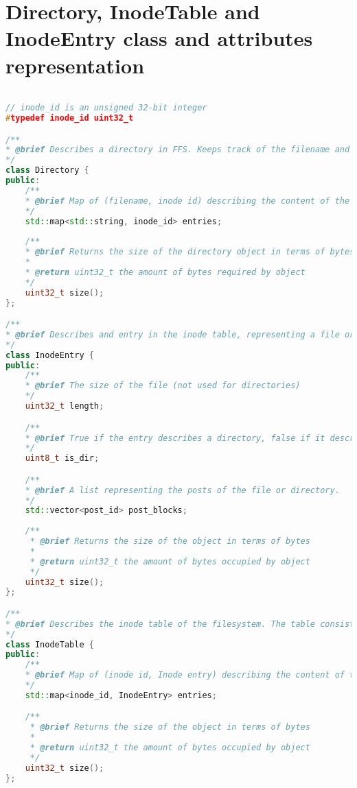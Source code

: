 \chapter{Directory, InodeTable and InodeEntry class and attributes representation}
\label{app:inode_dir_code}
\begin{lstlisting}[language=c++, caption={The attributes classes representing directories and the inode table in FFS}, label=lst:dir_itable_classes,breaklines=true]

// inode_id is an unsigned 32-bit integer
#typedef inode_id uint32_t

/**
* @brief Describes a directory in FFS. Keeps track of the filename and inode of each file
*/
class Directory {
public:
	/**
	* @brief Map of (filename, inode id) describing the content of the directory
	*/
	std::map<std::string, inode_id> entries;
	
	/**
	* @brief Returns the size of the directory object in terms of bytes
	* 
	* @return uint32_t the amount of bytes required by object
	*/
	uint32_t size();
};

/**
* @brief Describes and entry in the inode table, representing a file or directory
*/
class InodeEntry {
public:
	/**
	* @brief The size of the file (not used for directories) 
	*/
	uint32_t length;

	/**
	* @brief True if the entry describes a directory, false if it describes a file
	*/
	uint8_t is_dir;

	/**
	* @brief A list representing the posts of the file or directory. 
	*/
	std::vector<post_id> post_blocks;
	
	/**
	 * @brief Returns the size of the object in terms of bytes
	 * 
	 * @return uint32_t the amount of bytes occupied by object
	 */
	uint32_t size();
};

/**
* @brief Describes the inode table of the filesystem. The table consists of multiple inode entries
*/
class InodeTable {
public:
	/**
	* @brief Map of (inode id, Inode entry) describing the content of the inode table
	*/
	std::map<inode_id, InodeEntry> entries;

	/**
	 * @brief Returns the size of the object in terms of bytes
	 * 
	 * @return uint32_t the amount of bytes occupied by object
	 */
	uint32_t size();
};

\end{lstlisting}
